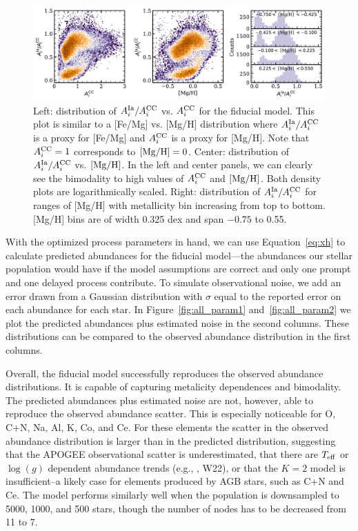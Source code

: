 \documentclass[modern]{aastex631}
\newcommand{\mgh}{[{\rm Mg}/{\rm H}]}
\newcommand{\logg}{\log(g)}
\newcommand{\teff}{T_{\rm eff}}
\newcommand{\Acc}{A^{\rm CC}_{i}}
\newcommand{\AIa}{A^{\rm Ia}_{i}}
\begin{document}
\begin{figure}[htb!]
    \centering
    \includegraphics[width=\textwidth]{As.pdf}
    \caption{Left: distribution of $\AIa/\Acc$ vs. $\Acc$ for the fiducial model. This plot is similar to a [Fe/Mg] vs. [Mg/H] distribution where $\AIa/\Acc$ is a proxy for [Fe/Mg] and $\Acc$ is a proxy for [Mg/H]. Note that $\Acc = 1$ corresponds to $\mgh = 0$. Center: distribution of $\AIa/\Acc$ vs. $\mgh$. In the left and center panels, we can clearly see the bimodality to high values of $\Acc$ and $\mgh$. Both density plots are logarithmically scaled. Right: distribution of $\AIa/\Acc$ for ranges of [Mg/H] with metallicity bin increasing from top to bottom. [Mg/H] bins are of width 0.325 dex and span $-0.75$ to 0.55.}
    \label{fig:As}
\end{figure}

With the optimized process parameters in hand, we can use Equation~\ref{eq:xh} to calculate predicted abundances for the fiducial model---the abundances our stellar population would have if the model assumptions are correct and only one prompt and one delayed process contribute. To simulate observational noise, we add an error drawn from a Gaussian distribution with $\sigma$ equal to the reported error on each abundance for each star. In Figure~\ref{fig:all_param1} and~\ref{fig:all_param2} we plot the predicted abundances plus estimated noise in the second columns. These distributions can be compared to the observed abundance distribution in the first columns.

Overall, the fiducial model successfully reproduces the observed abundance distributions. It is capable of capturing metalicity dependences and bimodality. The predicted abundances plus estimated noise are not, however, able to reproduce the observed abundance scatter. This is especially noticeable for O, C+N, Na, Al, K, Co, and Ce. For these elements the scatter in the observed abundance distribution is larger than in the predicted distribution, suggesting that the APOGEE observational scatter is underestimated, that there are $\teff$ or $\logg$ dependent abundance trends (e.g., \citealp{griffith2021a}, W22), or that the $K=2$ model is insufficient--a likely case for elements produced by AGB stars, such as C+N and Ce. The model performs similarly well when the population is downsampled to 5000, 1000, and 500 stars, though the number of nodes has to be decreased from 11 to 7.
\end{document}
